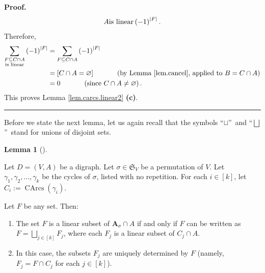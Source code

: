 \documentclass[numbers=enddot,12pt,final,onecolumn,notitlepage]{scrartcl}%
\numberwithin{exer}{section}
\theoremstyle{definition}
\newtheorem{lem}[theo]{Lemma}
\newenvironment{lemma}[1][]
{\begin{lem}[#1]\begin{leftbar}}
{\end{leftbar}\end{lem}}
\newenvironment{proof}[1][Proof]{\noindent\textbf{#1.} }{\ \rule{0.5em}{0.5em}}
\let\sumnonlimits\sum
\let\sqcupnonlimits\bigsqcup
\renewcommand{\sum}{\sumnonlimits\limits}
\renewcommand{\bigsqcup}{\sqcupnonlimits\limits}
\newenvironment{verlong}{}{}
\begin{document}
\begin{verlong}
\begin{proof}
\[{{A\\\text{is linear}}}\left(  -1\right)  ^{\left\vert F\right\vert }.
\]
Therefore,%
\begin{align*}
\sum_{\substack{F\subseteq C\cap A\\\text{is linear}}}\left(  -1\right)
^{\left\vert F\right\vert }  &  =\sum_{F\subseteq C\cap A}\left(  -1\right)
^{\left\vert F\right\vert }\\
&  =\left[  C\cap A=\varnothing\right]  \ \ \ \ \ \ \ \ \ \ \left(  \text{by
Lemma \ref{lem.cancel}, applied to }B=C\cap A\right) \\
&  =0\ \ \ \ \ \ \ \ \ \ \left(  \text{since }C\cap A\neq\varnothing\right)  .
\end{align*}
This proves Lemma \ref{lem.carcs.linear2} \textbf{(c)}.
\end{proof}

Before we state the next lemma, let us again recall that the symbols
\textquotedblleft$\sqcup$\textquotedblright\ and \textquotedblleft$\bigsqcup
$\textquotedblright\ stand for unions of disjoint sets.

\begin{lemma}
\label{lem.carcs.linear-split}Let $D=\left(  V,A\right)  $ be a digraph. Let
$\sigma\in\mathfrak{S}_{V}$ be a permutation of $V$. Let $\gamma_{1}%
,\gamma_{2},\ldots,\gamma_{k}$ be the cycles of $\sigma$, listed with no
repetition\footnotemark. For each $i\in\left[  k\right]  $, let $C_{i}%
:=\operatorname*{CArcs}\left(  \gamma_{i}\right)  $.

Let $F$ be any set. Then:

\begin{enumerate}
\item[\textbf{(a)}] The set $F$ is a linear subset of $\mathbf{A}_{\sigma}\cap
A$ if and only if $F$ can be written as $F=\bigsqcup_{j\in\left[  k\right]
}F_{j}$, where each $F_{j}$ is a linear subset of $C_{j}\cap A$.

\item[\textbf{(b)}] In this case, the subsets $F_{j}$ are uniquely determined
by $F$ (namely, $F_{j}=F\cap C_{j}$ for each $j\in\left[  k\right]  $).
\end{enumerate}
\end{lemma}



\end{verlong}
\end{document}

